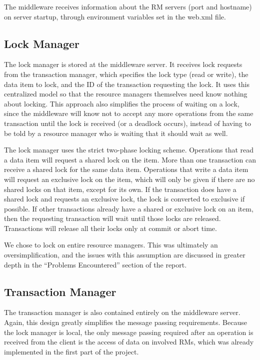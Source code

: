 \documentclass[11pt]{article}
\begin{document}
The middleware receives information about the RM servers (port and hostname) on server startup, through environment variables set in the web.xml file.  \par

\subsection*{Lock Manager}

The lock manager is stored at the middleware server. It receives lock requests from the transaction manager, which specifies the lock type (read or write), the data item to lock, and the ID of the transaction requesting the lock. It uses this centralized model so that the resource managers themselves need know nothing about locking. This approach also simplifies the process of waiting on a lock, since the middleware will know not to accept any more operations from the same transaction until the lock is received (or a deadlock occurs), instead of having to be told by a resource manager who is waiting that it should wait as well. \par

The lock manager uses the strict two-phase locking scheme. Operations that read a data item will request a shared lock on the item. More than one transaction can receive a shared lock for the same data item. Operations that write a data item will request an exclusive lock on the item, which will only be given if there are no shared locks on that item, except for its own. If the transaction does have a shared lock and requests an exclusive lock, the lock is converted to exclusive if possible. If other transactions already have a shared or exclusive lock on an item, then the requesting transaction will wait until those locks are released. Transactions will release all their locks only at commit or abort time. \par

We chose to lock on entire resource managers. This was ultimately an oversimplification, and the issues with this assumption are discussed in greater depth in the ``Problems Encountered'' section of the report.\par

\subsection*{Transaction Manager}

The transaction manager is also contained entirely on the middleware server. Again, this design greatly simplifies the message passing requirements. Because the lock manager is local, the only message passing required after an operation is received from the client is the access of data on involved RMs, which was already implemented in the first part of the project.  \par
\end{document}
